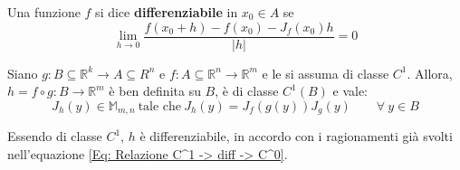\begin{definition} \label{Def: Differenziabilità di f. vettoriali}
    Una funzione $f$ si dice \textbf{differenziabile} in $x_0 \in A$ se
    \begin{equation*}
        \lim_{h \to 0}{\frac{f(x_0+h)-f(x_0)-J_f(x_0)h}{|h|}}=0
    \end{equation*}
\end{definition}

\begin{theorem} \label{Teo: Derivata composta di f. vettoriali}
Siano $g: B \subseteq \mathbb{R}^k \to A \subseteq R^n$ e $f: A \subseteq \mathbb{R}^n \to \mathbb{R}^m$ e le si assuma di classe $C^1$. Allora, $h=f \circ g: B \to \mathbb{R}^m$ è ben definita su $B$, è di classe $C^1(B)$ e vale:
\begin{equation*}
    J_h(y) \in \mathbb{M}_{m,n}\ \text{tale che}\ J_h(y)=J_f(g(y)) J_g(y) \qquad \forall\ y \in B
\end{equation*}
\end{theorem}
\begin{oss}
    Essendo di classe $C^1$, $h$ è differenziabile, in accordo con i ragionamenti già svolti nell'equazione \eqref{Eq: Relazione C^1 -> diff -> C^0}.
\end{oss}